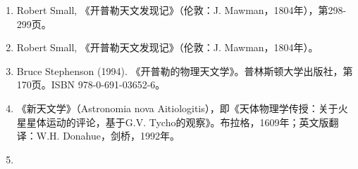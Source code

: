 \begin{enumerate}
\begin{itemize}
\end{itemize}
\item Robert Small, 《开普勒天文发现记》（伦敦：J. Mawman，1804年），第298-299页。  
\item Robert Small, 《开普勒天文发现记》（伦敦：J. Mawman，1804年）。  
\item Bruce Stephenson (1994). 《开普勒的物理天文学》。普林斯顿大学出版社，第170页。ISBN 978-0-691-03652-6。 
\item 《新天文学》（Astronomia nova Aitiologitis），即《天体物理学传授：关于火星星体运动的评论，基于G.V. Tycho的观察》。布拉格，1609年；英文版翻译：W.H. Donahue，剑桥，1992年。

\item 
\end{enumerate}









 
 
